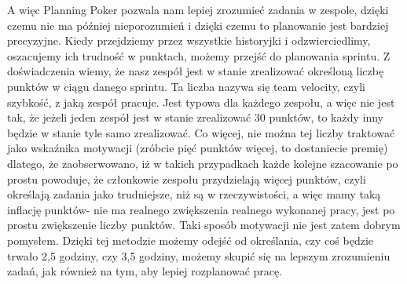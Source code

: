 A więc Planning Poker pozwala nam lepiej zrozumieć zadania w zespole,
dzięki czemu nie ma później nieporozumień i dzięki czemu to planowanie jest bardziej precyzyjne.
Kiedy przejdziemy przez wszystkie historyjki i odzwierciedlimy, oszacujemy ich trudność w punktach,
możemy przejść do planowania sprintu.
Z doświadczenia wiemy, że nasz zespół jest w stanie zrealizować określoną liczbę punktów w ciągu danego sprintu.
Ta liczba nazywa się team velocity, czyli szybkość, z jaką zespół pracuje. Jest typowa dla każdego zespołu,
a więc nie jest tak, że jeżeli jeden zespół jest w stanie zrealizować 30 punktów, to każdy inny będzie w stanie tyle samo zrealizować.
Co więcej, nie można tej liczby traktować jako wskaźnika motywacji (zróbcie pięć punktów więcej, to dostaniecie premię) dlatego,
że zaobserwowano, iż w takich przypadkach każde kolejne szacowanie po prostu powoduje,
że członkowie zespołu przydzielają więcej punktów, czyli określają zadania jako trudniejsze,
niż są w rzeczywistości, a więc mamy taką inflację punktów- nie ma realnego zwiększenia realnego wykonanej pracy,
jest po prostu zwiększenie liczby punktów. Taki sposób motywacji nie jest zatem dobrym pomysłem.
Dzięki tej metodzie możemy odejść od określania, czy coś będzie trwało 2,5 godziny,
czy 3,5 godziny, możemy skupić się na lepszym zrozumieniu zadań, jak również na tym, aby lepiej rozplanować pracę.

